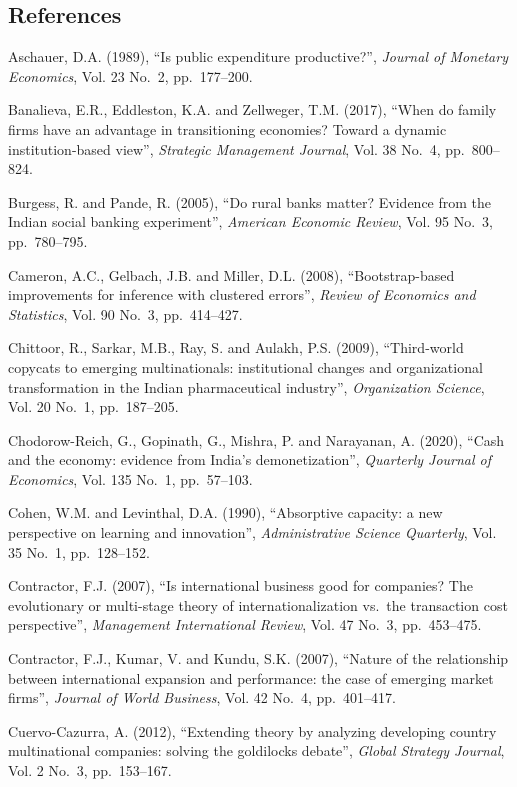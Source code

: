 \documentclass[
  12pt,a4paper]{article}
\begin{document}
\hypertarget{references}{%
\subsection{References}\label{references}}

Aschauer, D.A. (1989), ``Is public expenditure productive?'',
\emph{Journal of Monetary Economics}, Vol. 23 No.~2, pp.~177--200.

Banalieva, E.R., Eddleston, K.A. and Zellweger, T.M. (2017), ``When do
family firms have an advantage in transitioning economies? Toward a
dynamic institution-based view'', \emph{Strategic Management Journal},
Vol. 38 No.~4, pp.~800--824.

Burgess, R. and Pande, R. (2005), ``Do rural banks matter? Evidence from
the Indian social banking experiment'', \emph{American Economic Review},
Vol. 95 No.~3, pp.~780--795.

Cameron, A.C., Gelbach, J.B. and Miller, D.L. (2008), ``Bootstrap-based
improvements for inference with clustered errors'', \emph{Review of
Economics and Statistics}, Vol. 90 No.~3, pp.~414--427.

Chittoor, R., Sarkar, M.B., Ray, S. and Aulakh, P.S. (2009),
``Third-world copycats to emerging multinationals: institutional changes
and organizational transformation in the Indian pharmaceutical
industry'', \emph{Organization Science}, Vol. 20 No.~1, pp.~187--205.

Chodorow-Reich, G., Gopinath, G., Mishra, P. and Narayanan, A. (2020),
``Cash and the economy: evidence from India's demonetization'',
\emph{Quarterly Journal of Economics}, Vol. 135 No.~1, pp.~57--103.

Cohen, W.M. and Levinthal, D.A. (1990), ``Absorptive capacity: a new
perspective on learning and innovation'', \emph{Administrative Science
Quarterly}, Vol. 35 No.~1, pp.~128--152.

Contractor, F.J. (2007), ``Is international business good for companies?
The evolutionary or multi-stage theory of internationalization vs.~the
transaction cost perspective'', \emph{Management International Review},
Vol. 47 No.~3, pp.~453--475.

Contractor, F.J., Kumar, V. and Kundu, S.K. (2007), ``Nature of the
relationship between international expansion and performance: the case
of emerging market firms'', \emph{Journal of World Business}, Vol. 42
No.~4, pp.~401--417.

Cuervo-Cazurra, A. (2012), ``Extending theory by analyzing developing
country multinational companies: solving the goldilocks debate'',
\emph{Global Strategy Journal}, Vol. 2 No.~3, pp.~153--167.
\end{document}
